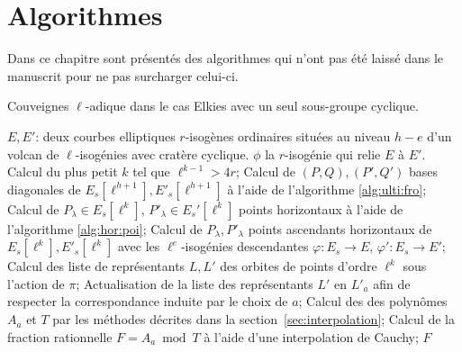 \documentclass[10pt,a4paper]{book}
\theoremstyle{plain}
\theoremstyle{definition}
\theoremstyle{definition}
\theoremstyle{definition}
\theoremstyle{definition}
\theoremstyle{definition}
\theoremstyle{remark}
\theoremstyle{remark}
\theoremstyle{definition}
\begin{document}
 




\appendix
\chapter{Algorithmes}
\label{cha:alg}
Dans ce chapitre sont présentés des algorithmes qui n'ont pas été laissé dans le manuscrit pour ne pas surcharger celui-ci.

\begin{algorithm}
\caption{\label{alg:app:cou:var} Couveignes $\ell$-adique dans le cas Elkies avec un seul sous-groupe cyclique.}
\begin{algorithmic}[1]
\REQUIRE $E,E'$: deux courbes elliptiques $r$-isogènes ordinaires situées au niveau $h-e$ d'un volcan de $\ell$-isogénies avec cratère cyclique.
\ENSURE $\phi$ la $r$-isogénie qui relie $E$ à $E'$.
\STATE Calcul du plus petit $k$ tel que $\ell^{k-1}>4r$;
\STATE  
Calcul de $(P,Q),(P',Q')$ bases diagonales de $E_s[\ell^{h+1}],E'_s[\ell^{h+1}]$ à l'aide de l'algorithme \ref{alg:ulti:fro};
\STATE Calcul de $P_{\lambda} \in E_s[\ell^k]$, $P'_{\lambda} \in E_s'[\ell^k]$ points horizontaux  à l'aide de l'algorithme \ref{alg:hor:poi};
\STATE 
Calcul de $P_{\lambda},P'_{\lambda}$ points ascendants 
horizontaux de $E_s[\ell^k],E'_s[\ell^k]$ avec les $\ell^e$-isogénies 
descendantes $\varphi: E_s \rightarrow E$, $\varphi': E_s \rightarrow E'$;
\ENDIF
\STATE Calcul des liste de représentants $L,L'$ des orbites de points d'ordre $\ell^k$ sous l'action de $\pi$;
\STATE Actualisation de la liste des représentants $L'$ en $L'_{a}$ afin de respecter la correspondance induite par le choix de $a$;
\STATE Calcul des des polynômes $A_{a}$ et $T$ par les méthodes décrites dans la section~\ref{sec:interpolation};
\STATE Calcul de la fraction rationnelle $F=A_{a} \bmod T$ à l'aide d'une interpolation de Cauchy;
\RETURN $F$
\ENDIF
\ENDFOR 
\end{algorithmic}
\end{algorithm}
\end{document}
